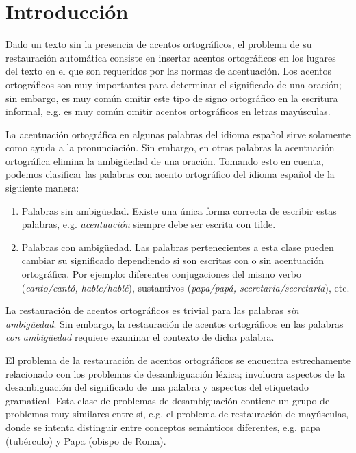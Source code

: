 \documentclass[runningheads,a4paper]{llncs}
\begin{document}
\section{Introducción}
Dado un texto sin la presencia de acentos ortográficos, el problema de su  restauración automática consiste en insertar acentos ortográficos en los lugares del texto en el que son requeridos por las normas de acentuación. Los acentos ortográficos son muy importantes para determinar el significado de una oración; sin embargo, es muy común omitir este tipo de signo ortográfico en la escritura informal, e.g. es muy común omitir acentos ortográficos en letras mayúsculas.

La acentuación ortográfica en algunas palabras del idioma español sirve solamente como ayuda a la pronunciación. Sin embargo, en otras palabras la acentuación ortográfica elimina la ambigüedad de una oración. Tomando esto en cuenta, podemos clasificar las palabras con acento ortográfico del idioma español de la siguiente manera\cite{CRANDALL95}:
\begin{enumerate}
\item{Palabras sin ambigüedad}. Existe una única forma correcta de escribir estas palabras, e.g. \emph{acentuación} siempre debe ser escrita con tilde.
\item{Palabras con ambigüedad}. Las palabras pertenecientes a esta clase pueden cambiar su significado dependiendo si son escritas con o sin acentuación ortográfica. Por ejemplo: diferentes conjugaciones del mismo verbo (\emph{canto/cantó, hable/hablé}), sustantivos (\emph{papa/papá, secretaria/secretaría}), etc.
\end{enumerate}

La restauración de acentos ortográficos es trivial para las palabras \emph{sin ambig\"uedad}. Sin embargo, la restauración de acentos ortográficos en las palabras \emph{con ambig\"uedad} requiere examinar el contexto de dicha palabra. 

El problema de la restauración de acentos ortográficos se encuentra estrechamente relacionado con los problemas de desambiguación léxica; involucra aspectos de la desambiguación del significado de una palabra y aspectos del etiquetado gramatical. Esta clase de problemas de desambiguación contiene un grupo de problemas muy similares entre sí, e.g. el problema de restauración de mayúsculas, donde se intenta distinguir entre conceptos semánticos diferentes, e.g. papa (tubérculo) y Papa (obispo de Roma).
\end{document}
